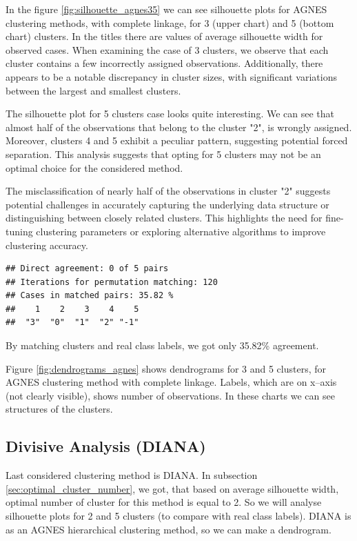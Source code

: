 \documentclass[11pt,a4paper]{article}\usepackage[]{graphicx}\usepackage[]{xcolor}
\makeatletter
\newenvironment{kframe}{%
 \def\at@end@of@kframe{}%
 \ifinner\ifhmode%
  \def\at@end@of@kframe{\end{minipage}}%
  \begin{minipage}{\columnwidth}%
 \fi\fi%
 \def\FrameCommand##1{\hskip\@totalleftmargin \hskip-\fboxsep
 \colorbox{shadecolor}{##1}\hskip-\fboxsep
     \hskip-\linewidth \hskip-\@totalleftmargin \hskip\columnwidth}%
 \MakeFramed {\advance\hsize-\width
   \@totalleftmargin\z@ \linewidth\hsize
   \@setminipage}}%
 {\par\unskip\endMakeFramed%
 \at@end@of@kframe}
\newenvironment{knitrout}{}{} %
\makeatother
\begin{document}
	In the figure \ref{fig:silhouette_agnes35} we can see silhouette plots for AGNES clustering methods, with complete linkage, for 3 (upper chart) and 5 (bottom chart) clusters. In the titles there are values of average silhouette width for observed cases. When examining the case of 3 clusters, we observe that each cluster contains a few incorrectly assigned observations. Additionally, there appears to be a notable discrepancy in cluster sizes, with significant variations between the largest and smallest clusters.
	
	The silhouette plot for 5 clusters case looks quite interesting. We can see that almost half of the observations that belong to the cluster "2", is wrongly assigned. Moreover, clusters 4 and 5 exhibit a peculiar pattern, suggesting potential forced separation. This analysis suggests that opting for 5 clusters may not be an optimal choice for the considered method.
	
The misclassification of nearly half of the observations in cluster "2" suggests potential challenges in accurately capturing the underlying data structure or distinguishing between closely related clusters. This highlights the need for fine-tuning clustering parameters or exploring alternative algorithms to improve clustering accuracy.	

	
\begin{knitrout}
\color{fgcolor}\begin{kframe}
\begin{verbatim}
## Direct agreement: 0 of 5 pairs
## Iterations for permutation matching: 120 
## Cases in matched pairs: 35.82 %
##    1    2    3    4    5 
##  "3"  "0"  "1"  "2" "-1"
\end{verbatim}
\end{kframe}
\end{knitrout}
	By matching clusters and real class labels, we got only 35.82\% agreement.
	
	Figure \ref{fig:dendrograms_agnes} shows dendrograms for 3 and 5 clusters, for AGNES clustering method with complete linkage. Labels, which are on x--axis  (not clearly visible), shows number of observations. In these charts we can see structures of the clusters. 
	
	\subsection{Divisive Analysis (DIANA)}
	
	Last considered clustering method is DIANA. In subsection \ref{sec:optimal_cluster_number}, we got, that based on average silhouette width, optimal number of cluster for this method is equal to 2. So we will analyse silhouette plots for 2 and 5 clusters (to compare with real class labels). DIANA is as an AGNES hierarchical clustering method, so we can make a dendrogram.
	
\end{document}
